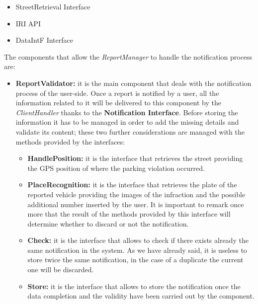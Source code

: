 			\begin{itemize}
				\item StreetRetrieval Interface
				\item IRI API
				\item DataIntF Interface
			\end{itemize}
		
			The components that allow the \emph{ReportManager} to handle the notification process are:
			
			\begin{itemize}
				\item \textbf{ReportValidator:} it is the main component that deals with the notification process of the user-side. Once a report is notified by a user, all the information related to it will be delivered to this component by the \emph{ClientHandler} thanks to the \textbf{Notification Interface}. Before storing the information it has to be managed in order to add the missing details and validate its content; these two further considerations are managed with the methods provided by the interfaces:
				
				\begin{itemize}
					\item \textbf{HandlePosition:} it is the interface that retrieves the street providing the GPS position of where the parking violation occurred.
					
					\item \textbf{PlaceRecognition:} it is the interface that retrieves the plate of the reported vehicle providing the images of the infraction and the possible additional number inserted by the user. It is important to remark once more that the result of the methods provided by this interface will determine whether to discard or not the notification.
					
					\item \textbf{Check:} it is the interface that allows to check if there exists already the same notification in the system. As we have already said, it is useless to store twice the same notification, in the case of a duplicate the current one will be discarded.
					
					\item \textbf{Store:} it is the interface that allows to store the notification once the data completion and the validity have been carried out by the component.
				\end{itemize}
			\end{itemize}
			
